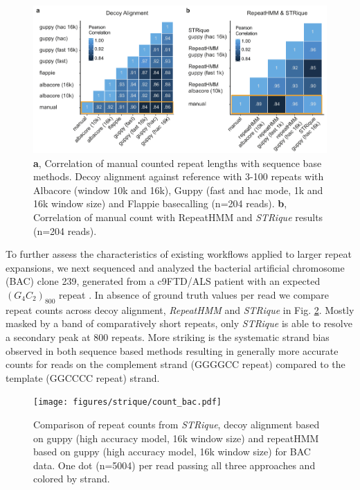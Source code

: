 \begin{figure}[h]
	\centering
	\includegraphics[width=1.0\textwidth]{figures/strique/count_sequence_corr.pdf}
	\captionsetup{format=plain}
	\caption[Correlation of sequence based STR detection methods]{\textbf{a}, Correlation of manual counted repeat lengths with sequence base methods. Decoy alignment against reference with 3-100 repeats with Albacore (window 10k and 16k), Guppy (fast and hac mode, 1k and 16k window size) and Flappie basecalling (n=204 reads). \textbf{b}, Correlation of manual count with RepeatHMM and \textit{STRique} results (n=204 reads).}
	\label{fig:strique:count_sequence_corr}
\end{figure}

To further assess the characteristics of existing workflows applied to larger repeat expansions, we next sequenced and analyzed the bacterial artificial chromosome (BAC) clone 239, generated from a c9FTD/ALS patient with an expected $ (G_{4}C_{2})_{800} $ repeat \cite{ORourke2015}. In absence of ground truth values per read we compare repeat counts across decoy alignment, \textit{RepeatHMM} and \textit{STRique} in Fig. \ref{fig:strique:count_bac}. Mostly masked by a band of comparatively short repeats, only \textit{STRique} is able to resolve a secondary peak at 800 repeats. More striking is the systematic strand bias observed in both sequence based methods resulting in generally more accurate counts for reads on the complement strand (GGGGCC repeat) compared to the template (GGCCCC repeat) strand.


\begin{figure}[h]
    \centering
    \texttt{[image: figures/strique/count\_bac.pdf]}
    \captionsetup{format=plain}
    \caption[Strand bias in sequence based repeat counts]{Comparison of repeat counts from \textit{STRique}, decoy alignment based on guppy (high accuracy model, 16k window size) and repeatHMM based on guppy (high accuracy model, 16k window size) for BAC data. One dot (n=5004) per read passing all three approaches and colored by strand.}
    \label{fig:strique:count_bac}
\end{figure}

